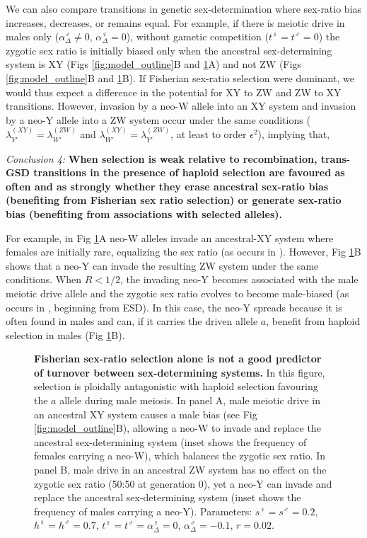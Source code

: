 \documentclass[10pt,letterpaper]{article}
\begin{document}
We can also compare transitions in genetic sex-determination where sex-ratio bias increases, decreases, or remains equal. 
For example, if there is meiotic drive in males only ($\alpha^\male_\Delta \neq 0$, $\alpha^\female_\Delta=0$), without gametic competition ($t^\female=t^\male=0$) the zygotic sex ratio is initially biased only when the ancestral sex-determining system is XY (Figs \ref{fig:model_outline}B and \ref{fig:SexRatioBad}A) and not ZW (Figs \ref{fig:model_outline}B and \ref{fig:SexRatioBad}B).
If Fisherian sex-ratio selection were dominant, we would thus expect a difference in the potential for XY to ZW and ZW to XY transitions. 
However, invasion by a neo-W allele into an XY system and invasion by a neo-Y allele into a ZW system occur under the same conditions ($\lambda_{Y'}^{(XY)} = \lambda_{W'}^{(ZW)}$ and $\lambda_{W'}^{(XY)}=\lambda_{Y'}^{(ZW)}$, at least to order $\epsilon^2$), implying that,
\vspace{0.5cm}

\noindent\textit{Conclusion 4:}
\textbf{When selection is weak relative to recombination, trans-GSD transitions in the presence of haploid selection are favoured as often and as strongly whether they erase ancestral sex-ratio bias (benefiting from Fisherian sex ratio selection) or generate sex-ratio bias (benefiting from associations with selected alleles). } 
\vspace{0.5cm}

\noindent For example, in Fig \ref{fig:SexRatioBad}A neo-W alleles invade an ancestral-XY system where females are initially rare, equalizing the sex ratio (as occurs in \cite{Kozielska:2010vm}).
However, Fig \ref{fig:SexRatioBad}B shows that a neo-Y can invade the resulting ZW system under the same conditions. 
When $R<1/2$, the invading neo-Y becomes associated with the male meiotic drive allele and the zygotic sex ratio evolves to become male-biased (as occurs in \cite{Ubeda:2015fx}, beginning from ESD). 
In this case, the neo-Y spreads because it is often found in males and can, if it carries the driven allele $a$, benefit from haploid selection in males (Fig \ref{fig:SexRatioBad}B).

\begin{figure}[!h]
\centering
\caption{
{\bf Fisherian sex-ratio selection alone is not a good predictor of turnover between sex-determining systems.}
In this figure, selection is ploidally antagonistic with haploid selection favouring the $a$ allele during male meiosis.
In panel A, male meiotic drive in an ancestral XY system causes a male bias (see Fig \ref{fig:model_outline}B), allowing a neo-W to invade and replace the ancestral sex-determining system (inset shows the frequency of females carrying a neo-W), which balances the zygotic sex ratio.
In panel B, male drive in an ancestral ZW system has no effect on the zygotic sex ratio (50:50 at generation 0), yet a neo-Y can invade and replace the ancestral sex-determining system (inset shows the frequency of males carrying a neo-Y). 
Parameters:  $s^\female =s^\male = 0.2$, $h^\female = h^\male = 0.7$, $t^\female = t^\male = \alpha^\female_\Delta = 0$, $\alpha^\male_\Delta = -0.1$, $r=0.02$.
}
\label{fig:SexRatioBad}
\end{figure}
\end{document}
